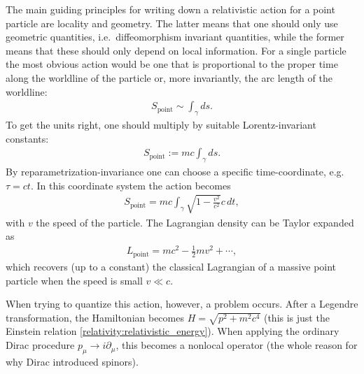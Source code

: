     The main guiding principles for writing down a relativistic action for a point particle are locality and geometry. The latter means that one should only use geometric quantities, i.e.~diffeomorphism invariant quantities, while the former means that these should only depend on local information. For a single particle the most obvious action would be one that is proportional to the proper time along the worldline of the particle or, more invariantly, the arc length of the worldline:
    \begin{gather}
        S_\mathrm{point}\sim\int_\gamma ds.
    \end{gather}
    To get the units right, one should multiply by suitable Lorentz-invariant constants:
    \begin{gather}
        \label{relativity:worldline_action}
        S_\mathrm{point}:=mc\int_\gamma ds.
    \end{gather}
    By reparametrization-invariance one can choose a specific time-coordinate, e.g.~$\tau=ct$. In this coordinate system the action becomes
    \begin{gather}
        S_\mathrm{point}=mc\int_\gamma\sqrt{1-\frac{v^2}{c^2}}c\,dt,
    \end{gather}
    with $v$ the speed of the particle. The Lagrangian density can be Taylor expanded as
    \begin{gather}
        L_\mathrm{point}=mc^2 - \frac{1}{2}mv^2 + \cdots,
    \end{gather}
    which recovers (up to a constant) the classical Lagrangian of a massive point particle when the speed is small $v\ll c$.

    When trying to quantize this action, however, a problem occurs. After a Legendre transformation, the Hamiltonian becomes $H=\sqrt{p^2+m^2c^4}$ (this is just the Einstein relation \ref{relativity:relativistic_energy}). When applying the ordinary Dirac procedure $p_\mu\longrightarrow i\partial_\mu$, this becomes a nonlocal operator (the whole reason for why Dirac introduced spinors).

